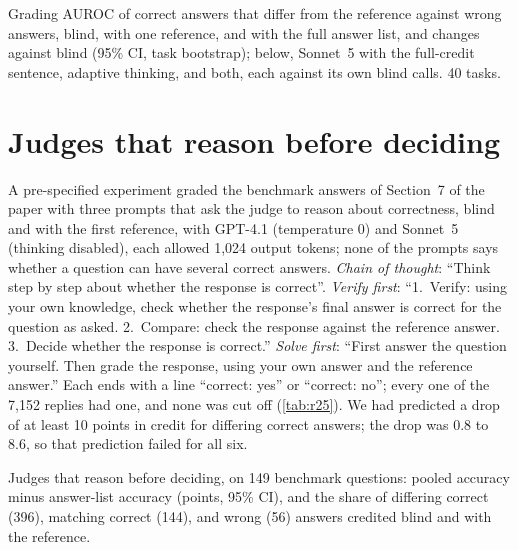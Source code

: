 \begin{table}[htbp]
\centering
\caption{Grading AUROC of correct answers that differ from the reference against wrong answers, blind, with one reference, and with the full answer list, and changes against blind (95\% CI, task bootstrap); below, Sonnet~5 with the full-credit sentence, adaptive thinking, and both, each against its own blind calls. 40 tasks.\pre}
\label{tab:r24-fix}
\footnotesize
\setlength{\tabcolsep}{3pt}
\begin{adjustbox}{max width=\linewidth}\end{adjustbox}
\end{table}

\FloatBarrier
\section{Judges that reason before deciding}
\label{app:r25}

A pre-specified experiment graded the benchmark answers of Section~7 of the paper with three prompts that ask the judge to reason about correctness, blind and with the first reference, with GPT-4.1 (temperature 0) and Sonnet~5 (thinking disabled), each allowed 1,024 output tokens; none of the prompts says whether a question can have several correct answers. \emph{Chain of thought}: ``Think step by step about whether the response is correct''. \emph{Verify first}: ``1.~Verify: using your own knowledge, check whether the response's final answer is correct for the question as asked. 2.~Compare: check the response against the reference answer. 3.~Decide whether the response is correct.'' \emph{Solve first}: ``First answer the question yourself. Then grade the response, using your own answer and the reference answer.'' Each ends with a line ``correct: yes'' or ``correct: no''; every one of the 7,152 replies had one, and none was cut off (\cref{tab:r25}). We had predicted a drop of at least 10 points in credit for differing correct answers; the drop was 0.8 to 8.6, so that prediction failed for all six.

\begin{table}[htbp]
\centering
\caption{Judges that reason before deciding, on 149 benchmark questions: pooled accuracy minus answer-list accuracy (points, 95\% CI), and the share of differing correct (396), matching correct (144), and wrong (56) answers credited blind and with the reference.\pre}
\label{tab:r25}
\footnotesize
\setlength{\tabcolsep}{3pt}
\begin{adjustbox}{max width=\linewidth}\end{adjustbox}
\end{table}

